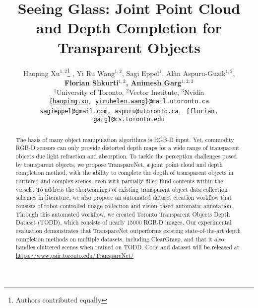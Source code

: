 \documentclass{article}
\title{Seeing Glass: Joint Point Cloud and Depth Completion for Transparent Objects}
\author{
Haoping Xu$^{1,2}$\thanks{Authors contributed equally} , %
Yi Ru Wang$^{1,2}$\footnotemark[1] , %
Sagi Eppel$^{1}$, %
Al\`{a}n Aspuru-Guzik$^{1,2}$, %
\\
\textbf{Florian Shkurti$^{1,2}$, %
Animesh Garg$^{1,2,3}$} \\
$^{1}$University of Toronto, 
$^{2}$Vector Institute,  
$^{3}$Nvidia\\
\texttt{\{\href{mailto:haoping.xu@mail.utoronto.ca}{haoping.xu},
\href{mailto:yiruhelen.wang@mail.utoronto.ca}{yiruhelen.wang}\}@mail.utoronto.ca} \\
\texttt{\href{mailto:sagieppel@gmail.com}{sagieppel}@gmail.com, \href{mailto:aspuru@utoronto.ca}{aspuru}@utoronto.ca},
\texttt{
\{\href{mailto:florian@cs.toronto.edu}{florian}, \href{mailto:garg@cs.toronto.edu}{garg}\}@cs.toronto.edu}}
\makeatletter
\def\blfootnote{\gdef\@thefnmark{}\@footnotetext}
\newcommand{\dataName}{TODD}
\makeatother
\begin{document}
\maketitle


\begin{abstract}
    The basis of many object manipulation algorithms is RGB-D input. Yet, commodity RGB-D sensors can only provide distorted depth maps for a wide range of transparent objects due light refraction and absorption. To tackle the perception challenges posed by transparent objects, we propose TranspareNet, a joint point cloud and depth completion method, with the ability to complete the depth of transparent objects in cluttered and complex scenes, even with partially filled fluid contents within the vessels. To address the shortcomings of existing transparent object data collection schemes in literature, we also propose an automated dataset creation workflow that consists of robot-controlled image collection and vision-based automatic annotation. Through this automated workflow, we created Toronto Transparent Objects Depth Dataset (\dataName), which consists of nearly 15000 RGB-D images. Our experimental evaluation demonstrates that TranspareNet outperforms existing state-of-the-art depth completion methods on multiple datasets, including ClearGrasp, and that it also handles cluttered scenes when trained on \dataName. Code and dataset will be released at \url{https://www.pair.toronto.edu/TranspareNet/}
    
    
    

    

\end{abstract}
\end{document}
